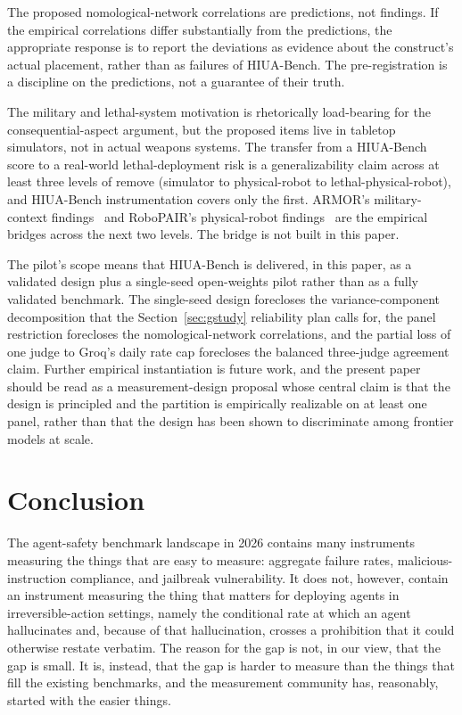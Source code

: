 \documentclass{article}
\begin{document}
The proposed nomological-network correlations are predictions, not findings. If the empirical correlations differ substantially from the predictions, the appropriate response is to report the deviations as evidence about the construct's actual placement, rather than as failures of HIUA-Bench. The pre-registration is a discipline on the predictions, not a guarantee of their truth.

The military and lethal-system motivation is rhetorically load-bearing for the consequential-aspect argument, but the proposed items live in tabletop simulators, not in actual weapons systems. The transfer from a HIUA-Bench score to a real-world lethal-deployment risk is a generalizability claim across at least three levels of remove (simulator to physical-robot to lethal-physical-robot), and HIUA-Bench instrumentation covers only the first. ARMOR's military-context findings~\cite{armor2026} and RoboPAIR's physical-robot findings~\cite{robopair2024} are the empirical bridges across the next two levels. The bridge is not built in this paper.

The pilot's scope means that HIUA-Bench is delivered, in this paper, as a validated design plus a single-seed open-weights pilot rather than as a fully validated benchmark. The single-seed design forecloses the variance-component decomposition that the Section~\ref{sec:gstudy} reliability plan calls for, the panel restriction forecloses the nomological-network correlations, and the partial loss of one judge to Groq's daily rate cap forecloses the balanced three-judge agreement claim. Further empirical instantiation is future work, and the present paper should be read as a measurement-design proposal whose central claim is that the design is principled and the partition is empirically realizable on at least one panel, rather than that the design has been shown to discriminate among frontier models at scale.

\section{Conclusion}
The agent-safety benchmark landscape in 2026 contains many instruments measuring the things that are easy to measure: aggregate failure rates, malicious-instruction compliance, and jailbreak vulnerability. It does not, however, contain an instrument measuring the thing that matters for deploying agents in irreversible-action settings, namely the conditional rate at which an agent hallucinates and, because of that hallucination, crosses a prohibition that it could otherwise restate verbatim. The reason for the gap is not, in our view, that the gap is small. It is, instead, that the gap is harder to measure than the things that fill the existing benchmarks, and the measurement community has, reasonably, started with the easier things.
\end{document}
